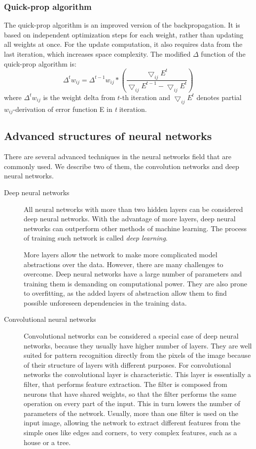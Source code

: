 \subsubsection{Quick-prop algorithm}
The quick-prop algorithm is an improved version of the backpropagation. It is based on independent optimization steps for each weight, rather than updating all weights at once. For the update computation, it also requires data from the last iteration, which increases space complexity. The modified $\Delta$ function of the quick-prop algorithm is:
\[
\Delta ^{t} w_{ij} = \Delta^{t-1} w_{ij}*(\frac {\bigtriangledown_{ij} E^{t}} {\bigtriangledown_{ij} E^{t-1} - \bigtriangledown_{ij} E^{t}})
\]
where $\Delta ^{t} w_{ij}$ is the weight delta from $t$-th iteration and $\bigtriangledown_{ij} E^{t}$ denotes partial $w_{ij}$-derivation of error function E in \emph{t} iteration.

\subsection{Advanced structures of neural networks}
There are several advanced techniques in the neural networks field that are commonly used. We describe two of them, the convolution networks and deep neural networks.

\begin{description}
\item [Deep neural networks]
All neural networks with more than two hidden layers can be considered deep neural networks. With the advantage of more layers, deep neural networks can outperform other methods of machine learning. The process of training such network is called \emph{deep learning}. 

More layers allow the network to make more complicated model abstractions over the data. However, there are many challenges to overcome. Deep neural networks have a large number of parameters and training them is demanding on computational power. They are also prone to overfitting, as the added layers of abstraction allow them to find possible unforeseen dependencies in the training data.

\item [Convolutional neural networks]
Convolutional networks can be considered a special case of deep neural networks, because they usually have higher number of layers. They are well suited for pattern recognition directly from the pixels of the image because of their structure of layers with different purposes.
For convolutional networks the convolutional layer is characteristic. This layer is essentially a filter, that performs feature extraction. The filter is composed from neurons that have shared weights, so that the filter performs the same operation on every part of the input. This in turn lowers the number of parameters of the network. Usually, more than one filter is used on the input image, allowing the network to extract different features from the simple ones like edges and corners, to very complex features, such as a house or a tree.
\end{description}

